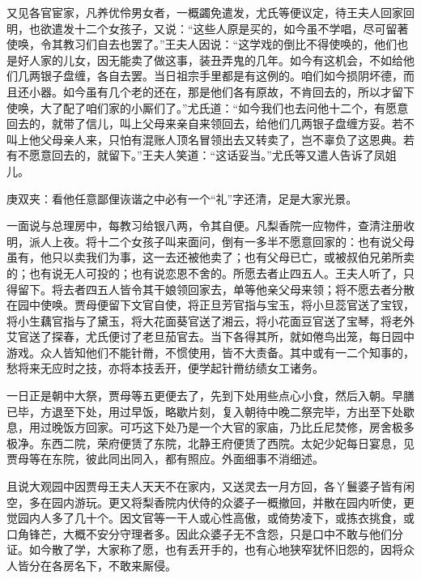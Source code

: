 \begin{parag}
    又见各官宦家，凡养优伶男女者，一概蠲免遣发，尤氏等便议定，待王夫人回家回明，也欲遣发十二个女孩子，又说：“这些人原是买的，如今虽不学唱，尽可留著使唤，令其教习们自去也罢了。”王夫人因说：“这学戏的倒比不得使唤的，他们也是好人家的儿女，因无能卖了做这事，装丑弄鬼的几年。如今有这机会，不如给他们几两银子盘缠，各自去罢。当日祖宗手里都是有这例的。咱们如今损阴坏德，而且还小器。如今虽有几个老的还在，那是他们各有原故，不肯回去的，所以才留下使唤，大了配了咱们家的小厮们了。”尤氏道：“如今我们也去问他十二个，有愿意回去的，就带了信儿，叫上父母来亲自来领回去，给他们几两银子盘缠方妥。若不叫上他父母亲人来，只怕有混账人顶名冒领出去又转卖了，岂不辜负了这恩典。若有不愿意回去的，就留下。”王夫人笑道：“这话妥当。”尤氏等又遣人告诉了凤姐儿。\begin{note}庚双夹：看他任意鄙俚诙谐之中必有一个“礼”字还清，足是大家光景。\end{note}一面说与总理房中，每教习给银八两，令其自便。凡梨香院一应物件，查清注册收明，派人上夜。将十二个女孩子叫来面问，倒有一多半不愿意回家的：也有说父母虽有，他只以卖我们为事，这一去还被他卖了；也有父母已亡，或被叔伯兄弟所卖的；也有说无人可投的；也有说恋恩不舍的。所愿去者止四五人。王夫人听了，只得留下。将去者四五人皆令其干娘领回家去，单等他亲父母来领；将不愿去者分散在园中使唤。贾母便留下文官自使，将正旦芳官指与宝玉，将小旦蕊官送了宝钗，将小生藕官指与了黛玉，将大花面葵官送了湘云，将小花面豆官送了宝琴，将老外艾官送了探春，尤氏便讨了老旦茄官去。当下各得其所，就如倦鸟出笼，每日园中游戏。众人皆知他们不能针黹，不惯使用，皆不大责备。其中或有一二个知事的，愁将来无应时之技，亦将本技丢开，便学起针黹纺绩女工诸务。
\end{parag}


\begin{parag}
    一日正是朝中大祭，贾母等五更便去了，先到下处用些点心小食，然后入朝。早膳已毕，方退至下处，用过早饭，略歇片刻，复入朝待中晚二祭完毕，方出至下处歇息，用过晚饭方回家。可巧这下处乃是一个大官的家庙，乃比丘尼焚修，房舍极多极净。东西二院，荣府便赁了东院，北静王府便赁了西院。太妃少妃每日宴息，见贾母等在东院，彼此同出同入，都有照应。外面细事不消细述。
\end{parag}


\begin{parag}
    且说大观园中因贾母王夫人天天不在家内，又送灵去一月方回，各丫鬟婆子皆有闲空，多在园内游玩。更又将梨香院内伏侍的众婆子一概撤回，并散在园内听使，更觉园内人多了几十个。因文官等一干人或心性高傲，或倚势凌下，或拣衣挑食，或口角锋芒，大概不安分守理者多。因此众婆子无不含怨，只是口中不敢与他们分证。如今散了学，大家称了愿，也有丢开手的，也有心地狭窄犹怀旧怨的，因将众人皆分在各房名下，不敢来厮侵。
\end{parag}



